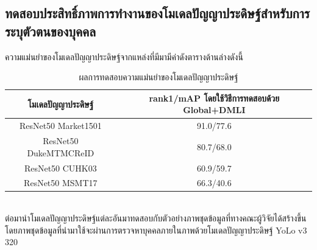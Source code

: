 \subsection{ทดสอบประสิทธิ์ภาพการทำงานของโมเดลปัญญาประดิษฐ์สำหรับการระบุตัวตนของบุคคล}
ความแม่นยำของโมเดลปัญญาประดิษฐ์จากแหล่งที่มีมามีค่าดังตารางด้านล่างดังนี้
\begin{table}[!ht]
    \centering
    \begin{tabular}{|c|c|}
            \hline
            {โมเดลปัญญาประดิษฐ์}&{rank1/mAP โดยใช้วิธีการทดสอบด้วย Global+DMLI}				\\
            \hline
            ResNet50 Market1501	 			& 91.0/77.6								\\
            ResNet50 DukeMTMCReID			& 80.7/68.0								\\
            ResNet50 CUHK03				& 60.9/59.7								\\
            ResNet50 MSMT17				& 66.3/40.6								\\
        \hline
    \end{tabular}
    \caption{ผลการทดสอบความแม่นยำของโมเดลปัญญาประดิษฐ์}
    \label{tab: Accuracy of model ReID}
\end{table}
\\
ต่อมานำโมเดลปัญญาประดิษฐ์แต่ละอันมาทดสอบกับตัวอย่างภาพชุดข้อมูลที่ทางคณะผู้วิจัยได้สร้างขึ้น โดยภาพชุดข้อมูลที่นำมาใช้จะผ่านการตรวจหาบุคคลภายในภาพด้วยโมเดลปัญญาประดิษฐ์ YoLo v3 320
